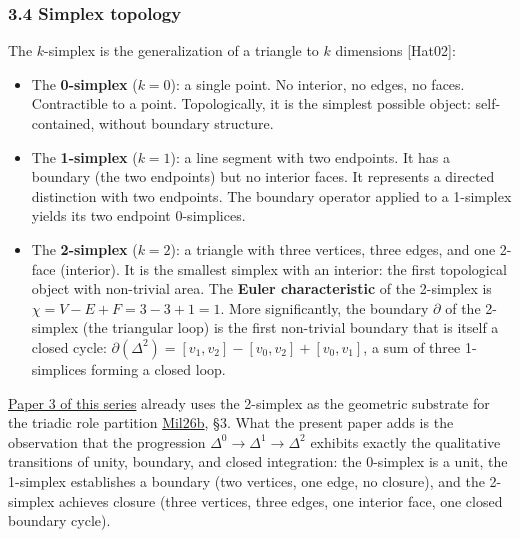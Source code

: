 \documentclass[
  11pt,
  letterpaper,
]{article}
\begin{document}
\subsubsection{3.4 Simplex topology}\label{simplex-topology}

The \(k\)-simplex is the generalization of a triangle to \(k\)
dimensions {[}Hat02{]}:

\begin{itemize}
\item
  The \textbf{0-simplex} (\(k=0\)): a single point. No interior, no
  edges, no faces. Contractible to a point. Topologically, it is the
  simplest possible object: self-contained, without boundary structure.
\item
  The \textbf{1-simplex} (\(k=1\)): a line segment with two endpoints.
  It has a boundary (the two endpoints) but no interior faces. It
  represents a directed distinction with two endpoints. The boundary
  operator applied to a 1-simplex yields its two endpoint 0-simplices.
\item
  The \textbf{2-simplex} (\(k=2\)): a triangle with three vertices,
  three edges, and one 2-face (interior). It is the smallest simplex
  with an interior: the first topological object with non-trivial area.
  The \textbf{Euler characteristic} of the 2-simplex is
  \(\chi = V - E + F = 3 - 3 + 1 = 1\). More significantly, the boundary
  \(\partial\) of the 2-simplex (the triangular loop) is the first
  non-trivial boundary that is itself a closed cycle:
  \(\partial(\Delta^2) = [v_1, v_2] - [v_0, v_2] + [v_0, v_1]\), a sum
  of three 1-simplices forming a closed loop.
\end{itemize}

\href{https://github.com/baardev/truevalue/blob/main/docnav/Research/papers/3_minimal-recursive-triadic-framework/3_minimal-recursive-triadic-framework.pdf}{Paper
3 of this series} already uses the 2-simplex as the geometric substrate
for the triadic role partition
\href{https://github.com/baardev/truevalue/blob/main/docnav/Research/papers/3_minimal-recursive-triadic-framework/3_minimal-recursive-triadic-framework.pdf}{Mil26b},
§3. What the present paper adds is the observation that the progression
\(\Delta^0 \to \Delta^1 \to \Delta^2\) exhibits exactly the qualitative
transitions of unity, boundary, and closed integration: the 0-simplex is
a unit, the 1-simplex establishes a boundary (two vertices, one edge, no
closure), and the 2-simplex achieves closure (three vertices, three
edges, one interior face, one closed boundary cycle).
\end{document}
